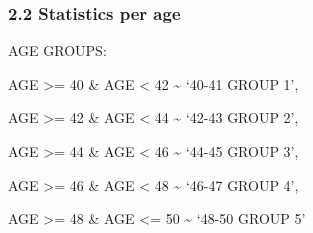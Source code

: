 \documentclass[
]{article}
\begin{document}
\subsubsection{\texorpdfstring{\textbf{2.2 Statistics per
age}}{2.2 Statistics per age}}\label{statistics-per-age}

AGE GROUPS:

AGE \textgreater= 40 \& AGE \textless{} 42 \textasciitilde{} `40-41
GROUP 1',

AGE \textgreater= 42 \& AGE \textless{} 44 \textasciitilde{} `42-43
GROUP 2',

AGE \textgreater= 44 \& AGE \textless{} 46 \textasciitilde{} `44-45
GROUP 3',

AGE \textgreater= 46 \& AGE \textless{} 48 \textasciitilde{} `46-47
GROUP 4',

AGE \textgreater= 48 \& AGE \textless= 50 \textasciitilde{} `48-50 GROUP
5'
\end{document}

